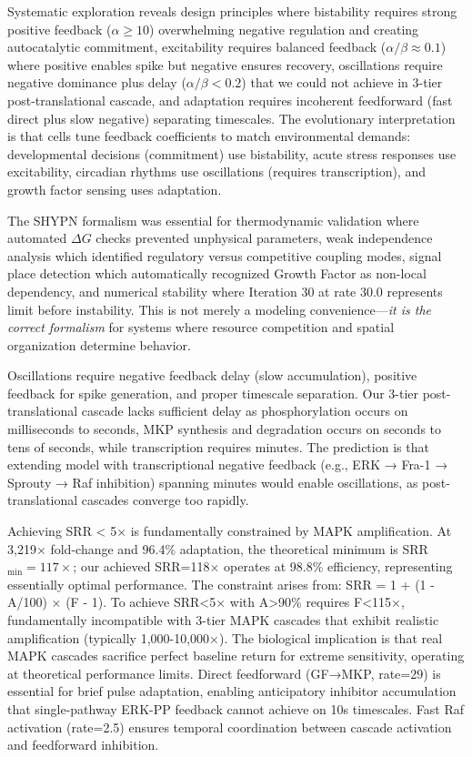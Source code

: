 \documentclass[twocolumn,11pt]{article}
\begin{document}
Systematic exploration reveals design principles where bistability requires strong positive feedback ($\alpha \geq 10$) overwhelming negative regulation and creating autocatalytic commitment, excitability requires balanced feedback ($\alpha/\beta \approx 0.1$) where positive enables spike but negative ensures recovery, oscillations require negative dominance plus delay ($\alpha/\beta < 0.2$) that we could not achieve in 3-tier post-translational cascade, and adaptation requires incoherent feedforward (fast direct plus slow negative) separating timescales. The evolutionary interpretation is that cells tune feedback coefficients to match environmental demands: developmental decisions (commitment) use bistability, acute stress responses use excitability, circadian rhythms use oscillations (requires transcription), and growth factor sensing uses adaptation.

The SHYPN formalism was essential for thermodynamic validation where automated $\Delta G$ checks prevented unphysical parameters, weak independence analysis which identified regulatory versus competitive coupling modes, signal place detection which automatically recognized Growth Factor as non-local dependency, and numerical stability where Iteration 30 at rate 30.0 represents limit before instability. This is not merely a modeling convenience—\textit{it is the correct formalism} for systems where resource competition and spatial organization determine behavior.

Oscillations require negative feedback delay (slow accumulation), positive feedback for spike generation, and proper timescale separation. Our 3-tier post-translational cascade lacks sufficient delay as phosphorylation occurs on milliseconds to seconds, MKP synthesis and degradation occurs on seconds to tens of seconds, while transcription requires minutes. The prediction is that extending model with transcriptional negative feedback (e.g., ERK → Fra-1 → Sprouty → Raf inhibition) spanning minutes would enable oscillations, as post-translational cascades converge too rapidly.

Achieving SRR < 5× is fundamentally constrained by MAPK amplification. At 3,219× fold-change and 96.4\% adaptation, the theoretical minimum is SRR$_{\text{min}}=117×$; our achieved SRR=118× operates at 98.8\% efficiency, representing essentially optimal performance. The constraint arises from: SRR = 1 + (1 - A/100) × (F - 1). To achieve SRR<5× with A>90\% requires F<115×, fundamentally incompatible with 3-tier MAPK cascades that exhibit realistic amplification (typically 1,000-10,000×). The biological implication is that real MAPK cascades sacrifice perfect baseline return for extreme sensitivity, operating at theoretical performance limits. Direct feedforward (GF→MKP, rate=29) is essential for brief pulse adaptation, enabling anticipatory inhibitor accumulation that single-pathway ERK-PP feedback cannot achieve on 10s timescales. Fast Raf activation (rate=2.5) ensures temporal coordination between cascade activation and feedforward inhibition.
\end{document}
